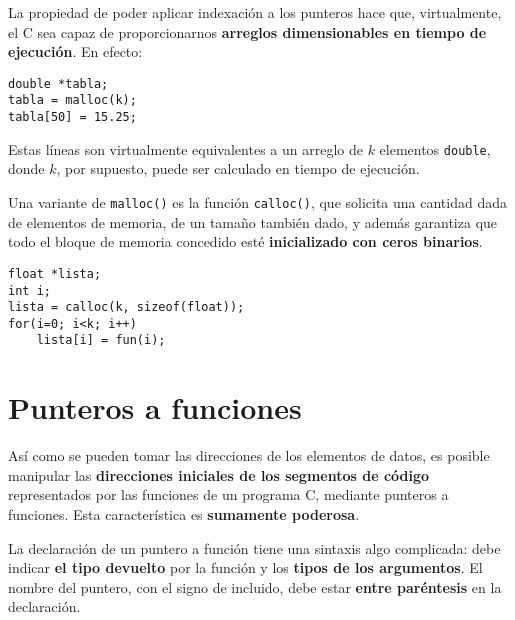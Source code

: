 \begin{ejemplo}
La propiedad de poder aplicar indexación a los punteros hace que, virtualmente,
el C sea capaz de proporcionarnos \textbf{arreglos dimensionables en tiempo de
ejecución}. En efecto:

\begin{lstlisting}
double *tabla;
tabla = malloc(k);
tabla[50] = 15.25;
\end{lstlisting}

Estas líneas son virtualmente equivalentes a un arreglo de $k$ elementos \lstinline{double},
donde $k$, por supuesto, puede ser calculado en tiempo de ejecución.

Una variante de \lstinline{malloc()} es la función \lstinline{calloc()}, que solicita una cantidad dada de
elementos de memoria, de un tamaño también dado, y además garantiza que todo el
bloque de memoria concedido esté \textbf{inicializado con ceros binarios}.

\begin{lstlisting}
float *lista;
int i;
lista = calloc(k, sizeof(float));
for(i=0; i<k; i++)
    lista[i] = fun(i);
\end{lstlisting}
\end{ejemplo}



\section{Punteros a funciones}
Así como se pueden tomar las direcciones de los elementos de datos, es posible
manipular las \textbf{direcciones iniciales de los segmentos de código} representados
por las funciones de un programa C, mediante punteros a funciones. Esta
característica es \textbf{sumamente poderosa}.

La declaración de un puntero a función tiene una sintaxis algo complicada: debe
indicar \textbf{el tipo devuelto} por la función y los \textbf{tipos de los argumentos}. El nombre del puntero, con el signo de  incluido, debe estar \textbf{entre paréntesis} en la declaración.

